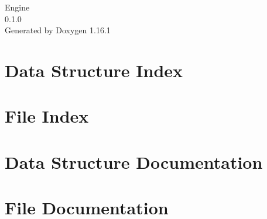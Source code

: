 \documentclass[twoside]{book}
\newcommand{\+}{\discretionary{\mbox{\scriptsize$\hookleftarrow$}}{}{}}
\newcommand{\clearemptydoublepage}{%
    \newpage{\pagestyle{empty}\cleardoublepage}%
  }
\begin{document}
  \raggedbottom
    \hypersetup{pageanchor=false,
                bookmarksnumbered=true,
                pdfencoding=unicode
               }
  \begin{titlepage}
  \vspace*{7cm}
  \begin{center}%
  {\Large Engine}\\
  [1ex]\large 0.\+1.\+0 \\
  \vspace*{1cm}
  {\large Generated by Doxygen 1.16.1}\\
  \end{center}
  \end{titlepage}
  \clearemptydoublepage
  \tableofcontents
  \clearemptydoublepage
  \hypersetup{pageanchor=true}
\chapter{Data Structure Index}

\chapter{File Index}

\chapter{Data Structure Documentation}







\chapter{File Documentation}




















  \backmatter
  \newpage
  \clearemptydoublepage
  \printindex
\end{document}
